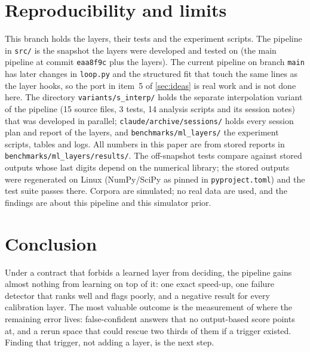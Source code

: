 \documentclass[11pt]{article}
\theoremstyle{plain}
\theoremstyle{definition}
\theoremstyle{remark}
\begin{document}
\section{Reproducibility and limits}\label{sec:repro}
This branch holds the layers, their tests and the experiment scripts. The pipeline in \texttt{src/} is the snapshot the layers were developed and tested on (the main pipeline at commit \texttt{eaa8f9c} plus the layers). The current pipeline
on branch \texttt{main} has later changes in \texttt{loop.py} and the structured fit that touch the same lines as the layer hooks, so the port in item~5 of \cref{sec:ideas} is real work and is not done here. The directory \texttt{variants/s\_interp/} holds the separate interpolation variant of the pipeline (15 source files, 3 tests, 14 analysis scripts and its session notes) that was developed in parallel; \texttt{claude/archive/sessions/} holds every session plan and report of the layers, and \texttt{benchmarks/ml\_layers/} the experiment scripts, tables and logs. All
numbers in this paper are from stored reports in \texttt{benchmarks/ml\_layers/results/}. The off-snapshot tests compare against stored outputs whose last digits depend on the numerical library;
the stored outputs were regenerated on Linux (NumPy/SciPy as pinned in \texttt{pyproject.toml}) and the test suite passes there. Corpora are simulated; no real data are used, and the findings are about this pipeline and this simulator prior.

\section{Conclusion}\label{sec:conclusion}
Under a contract that forbids a learned layer from deciding, the pipeline gains almost nothing from learning on top of it: one exact speed-up, one failure detector that ranks well and flags poorly, and a negative result for every
calibration layer. The most valuable outcome is the measurement of where the remaining error lives: false-confident answers that no output-based score points at, and a rerun space that could rescue two thirds of them if a trigger existed.
Finding that trigger, not adding a layer, is the next step.

\appendix

\end{document}
